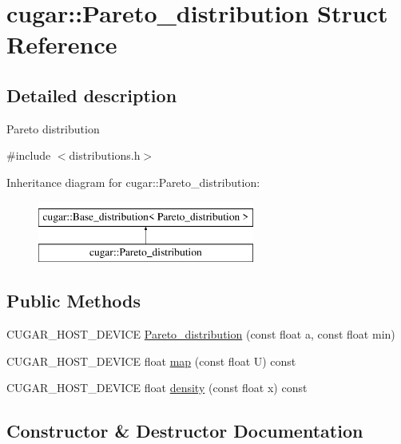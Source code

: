 \hypertarget{structcugar_1_1_pareto__distribution}{}\section{cugar\+:\+:Pareto\+\_\+distribution Struct Reference}
\label{structcugar_1_1_pareto__distribution}


\subsection{Detailed description}
Pareto distribution 

{\ttfamily \#include $<$distributions.\+h$>$}

Inheritance diagram for cugar\+:\+:Pareto\+\_\+distribution\+:\begin{figure}[H]
\begin{center}
\leavevmode
\includegraphics[height=2.000000cm]{structcugar_1_1_pareto__distribution}
\end{center}
\end{figure}
\subsection*{Public Methods}
\begin{DoxyCompactItemize}
\item 
C\+U\+G\+A\+R\+\_\+\+H\+O\+S\+T\+\_\+\+D\+E\+V\+I\+CE \hyperlink{structcugar_1_1_pareto__distribution_a316908fdf3b7a364f5cf4d5c78309527}{Pareto\+\_\+distribution} (const float a, const float min)
\item 
C\+U\+G\+A\+R\+\_\+\+H\+O\+S\+T\+\_\+\+D\+E\+V\+I\+CE float \hyperlink{structcugar_1_1_pareto__distribution_ac168806c81e9638f01ba994e746ed30f}{map} (const float U) const
\item 
C\+U\+G\+A\+R\+\_\+\+H\+O\+S\+T\+\_\+\+D\+E\+V\+I\+CE float \hyperlink{structcugar_1_1_pareto__distribution_ab4fff6aa700593597ff36de102b62d43}{density} (const float x) const
\end{DoxyCompactItemize}


\subsection{Constructor \& Destructor Documentation}
\mbox{\label{structcugar_1_1_pareto__distribution_a316908fdf3b7a364f5cf4d5c78309527}} 
